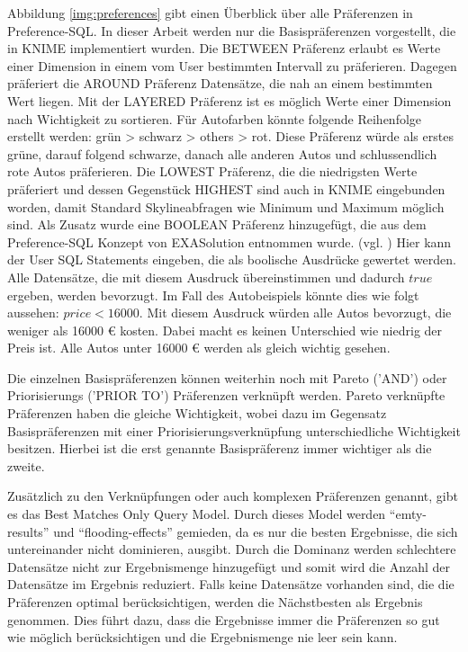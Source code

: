 Abbildung \ref{img:preferences} gibt einen Überblick über alle Präferenzen in Preference-SQL. In dieser Arbeit werden nur die Basispräferenzen vorgestellt, die in KNIME implementiert wurden. Die BETWEEN Präferenz erlaubt es Werte einer Dimension in einem vom User bestimmten Intervall zu präferieren. Dagegen präferiert die AROUND Präferenz Datensätze, die nah an einem bestimmten Wert liegen. Mit der LAYERED Präferenz ist es möglich Werte einer Dimension nach Wichtigkeit zu sortieren. Für Autofarben könnte folgende Reihenfolge erstellt werden: grün > schwarz > others > rot. Diese Präferenz würde als erstes grüne, darauf folgend schwarze, danach alle anderen Autos und schlussendlich rote Autos präferieren.
Die LOWEST Präferenz, die die niedrigsten Werte präferiert und dessen Gegenstück HIGHEST sind auch in KNIME eingebunden worden, damit Standard Skylineabfragen wie Minimum und Maximum möglich sind.
Als Zusatz wurde eine BOOLEAN Präferenz hinzugefügt, die aus dem Preference-SQL Konzept von EXASolution entnommen wurde. (vgl. \cite{EXASolution}) Hier kann der User SQL Statements eingeben, die als boolische Ausdrücke gewertet werden. Alle Datensätze, die mit diesem Ausdruck übereinstimmen und dadurch $true$ ergeben, werden bevorzugt. Im Fall des Autobeispiels könnte dies wie folgt aussehen: $price < 16000$. Mit diesem Ausdruck würden alle Autos bevorzugt, die weniger als 16000 \euro{} kosten. Dabei macht es keinen Unterschied wie niedrig der Preis ist. Alle Autos unter 16000 \euro{} werden als gleich wichtig gesehen. 

Die einzelnen Basispräferenzen können weiterhin noch mit Pareto ('AND') oder Priorisierungs ('PRIOR TO') Präferenzen verknüpft werden. Pareto verknüpfte Präferenzen haben die gleiche Wichtigkeit, wobei dazu im Gegensatz Basispräferenzen mit einer Priorisierungsverknüpfung unterschiedliche Wichtigkeit besitzen. Hierbei ist die erst genannte Basispräferenz immer wichtiger als die zweite.  

Zusätzlich zu den Verknüpfungen oder auch komplexen Präferenzen genannt, gibt es das Best Matches Only Query Model. Durch dieses Model werden \enquote{emty-results} und \enquote{flooding-effects} gemieden, da es nur die besten Ergebnisse, die sich untereinander nicht dominieren, ausgibt. Durch die Dominanz werden schlechtere Datensätze nicht zur Ergebnismenge hinzugefügt und somit wird die Anzahl der Datensätze im Ergebnis reduziert. Falls keine Datensätze vorhanden sind, die die Präferenzen optimal berücksichtigen, werden die Nächstbesten als Ergebnis genommen. Dies führt dazu, dass die Ergebnisse immer die Präferenzen so gut wie möglich berücksichtigen und die Ergebnismenge nie leer sein kann.

